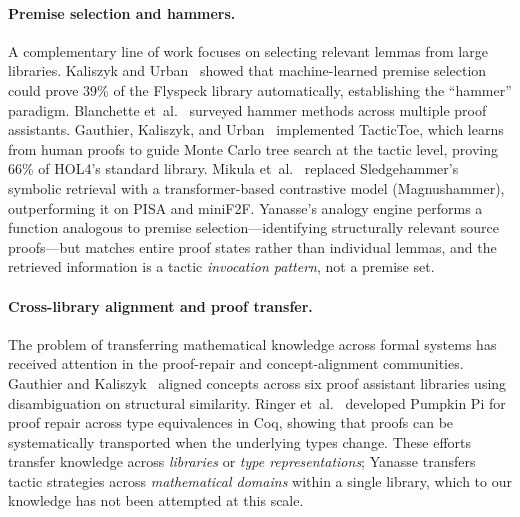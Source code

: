 \documentclass[11pt]{article}
\theoremstyle{definition}
\theoremstyle{remark}
\begin{document}
\paragraph{Premise selection and hammers.}
A complementary line of work focuses on selecting relevant lemmas
from large libraries.  Kaliszyk and
Urban~\cite{kaliszyk2014flyspeck} showed that machine-learned
premise selection could prove 39\% of the Flyspeck library
automatically, establishing the ``hammer'' paradigm.  Blanchette
et~al.~\cite{blanchette2016hammering} surveyed hammer methods
across multiple proof assistants.  Gauthier, Kaliszyk, and
Urban~\cite{gauthier2021tactictoe} implemented TacticToe, which
learns from human proofs to guide Monte Carlo tree search at the
tactic level, proving 66\% of HOL4's standard library.
Mikula et~al.~\cite{mikula2024magnushammer} replaced
Sledgehammer's symbolic retrieval with a transformer-based
contrastive model (Magnushammer), outperforming it on PISA and
miniF2F.  Yanasse's analogy engine performs a function analogous
to premise selection---identifying structurally relevant source
proofs---but matches entire proof states rather than individual
lemmas, and the retrieved information is a tactic
\emph{invocation pattern}, not a premise set.

\paragraph{Cross-library alignment and proof transfer.}
The problem of transferring mathematical knowledge across formal
systems has received attention in the proof-repair and
concept-alignment communities.  Gauthier and
Kaliszyk~\cite{gauthier2019aligning} aligned concepts across six
proof assistant libraries using disambiguation on structural
similarity.  Ringer et~al.~\cite{ringer2021proofrepair}
developed Pumpkin Pi for proof repair across type equivalences in
Coq, showing that proofs can be systematically transported when the
underlying types change.  These efforts transfer knowledge across
\emph{libraries} or \emph{type representations}; Yanasse transfers
tactic strategies across \emph{mathematical domains} within a single
library, which to our knowledge has not been attempted at this scale.
\end{document}
